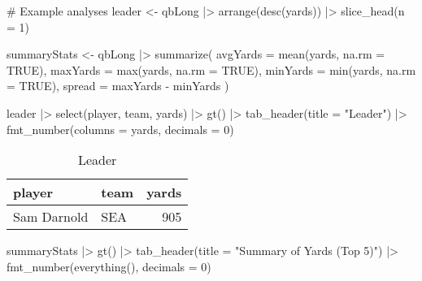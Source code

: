 \documentclass[
  letterpaper,
  DIV=11,
  numbers=noendperiod]{scrartcl}
\newenvironment{Shaded}{\begin{snugshade}}{\end{snugshade}}
\newcommand{\AttributeTok}[1]{\textcolor[rgb]{0.40,0.45,0.13}{#1}}
\newcommand{\CommentTok}[1]{\textcolor[rgb]{0.37,0.37,0.37}{#1}}
\newcommand{\ConstantTok}[1]{\textcolor[rgb]{0.56,0.35,0.01}{#1}}
\newcommand{\DecValTok}[1]{\textcolor[rgb]{0.68,0.00,0.00}{#1}}
\newcommand{\FunctionTok}[1]{\textcolor[rgb]{0.28,0.35,0.67}{#1}}
\newcommand{\NormalTok}[1]{\textcolor[rgb]{0.00,0.23,0.31}{#1}}
\newcommand{\OtherTok}[1]{\textcolor[rgb]{0.00,0.23,0.31}{#1}}
\newcommand{\SpecialCharTok}[1]{\textcolor[rgb]{0.37,0.37,0.37}{#1}}
\newcommand{\StringTok}[1]{\textcolor[rgb]{0.13,0.47,0.30}{#1}}
\begin{document}
\begin{Shaded}
\begin{Highlighting}[]
\CommentTok{\# Example analyses}
\NormalTok{leader }\OtherTok{\textless{}{-}}\NormalTok{ qbLong }\SpecialCharTok{|\textgreater{}}
  \FunctionTok{arrange}\NormalTok{(}\FunctionTok{desc}\NormalTok{(yards)) }\SpecialCharTok{|\textgreater{}}
  \FunctionTok{slice\_head}\NormalTok{(}\AttributeTok{n =} \DecValTok{1}\NormalTok{)}

\NormalTok{summaryStats }\OtherTok{\textless{}{-}}\NormalTok{ qbLong }\SpecialCharTok{|\textgreater{}}
  \FunctionTok{summarize}\NormalTok{(}
    \AttributeTok{avgYards =} \FunctionTok{mean}\NormalTok{(yards, }\AttributeTok{na.rm =} \ConstantTok{TRUE}\NormalTok{),}
    \AttributeTok{maxYards =} \FunctionTok{max}\NormalTok{(yards, }\AttributeTok{na.rm =} \ConstantTok{TRUE}\NormalTok{),}
    \AttributeTok{minYards =} \FunctionTok{min}\NormalTok{(yards, }\AttributeTok{na.rm =} \ConstantTok{TRUE}\NormalTok{),}
    \AttributeTok{spread =}\NormalTok{ maxYards }\SpecialCharTok{{-}}\NormalTok{ minYards}
\NormalTok{  )}

\NormalTok{leader }\SpecialCharTok{|\textgreater{}}
  \FunctionTok{select}\NormalTok{(player, team, yards) }\SpecialCharTok{|\textgreater{}}
  \FunctionTok{gt}\NormalTok{() }\SpecialCharTok{|\textgreater{}}
  \FunctionTok{tab\_header}\NormalTok{(}\AttributeTok{title =} \StringTok{"Leader"}\NormalTok{) }\SpecialCharTok{|\textgreater{}}
  \FunctionTok{fmt\_number}\NormalTok{(}\AttributeTok{columns =}\NormalTok{ yards, }\AttributeTok{decimals =} \DecValTok{0}\NormalTok{)}
\end{Highlighting}
\end{Shaded}

\begin{table}
\caption*{
{\fontsize{20}{25}\selectfont  Leader\fontsize{12}{15}\selectfont }
} 
\fontsize{12.0pt}{14.0pt}\selectfont
\begin{tabular*}{\linewidth}{@{\extracolsep{\fill}}llr}
\toprule
player & team & yards \\ 
\midrule\addlinespace[2.5pt]
Sam Darnold & SEA & 905 \\ 
\bottomrule
\end{tabular*}
\end{table}

\begin{Shaded}
\begin{Highlighting}[]
\NormalTok{summaryStats }\SpecialCharTok{|\textgreater{}}
  \FunctionTok{gt}\NormalTok{() }\SpecialCharTok{|\textgreater{}}
  \FunctionTok{tab\_header}\NormalTok{(}\AttributeTok{title =} \StringTok{"Summary of Yards (Top 5)"}\NormalTok{) }\SpecialCharTok{|\textgreater{}}
  \FunctionTok{fmt\_number}\NormalTok{(}\FunctionTok{everything}\NormalTok{(), }\AttributeTok{decimals =} \DecValTok{0}\NormalTok{)}
\end{Highlighting}
\end{Shaded}
\end{document}
